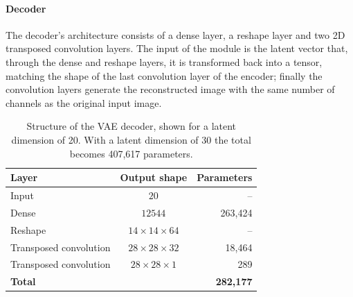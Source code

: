 \paragraph{Decoder}
\hfill \break
The decoder's architecture consists of a dense layer, a reshape layer and two 2D transposed convolution layers. The input of the module is the latent vector that, through the dense and reshape layers, it is transformed back into a tensor, matching the shape of the last convolution layer of the encoder; finally the convolution layers generate the reconstructed image with the same number of channels as the original input image.
\begin{table}[H]
    \centering
    \begin{tabular}{l c r}
    \textbf{Layer} & \textbf{Output shape} & \textbf{Parameters} \\
    \hline
    Input & \( 20 \) & -- \\
    Dense & \( 12544 \) & 263{,}424 \\
    Reshape & \( 14 \times 14 \times 64 \) & -- \\
    Transposed convolution & \( 28 \times 28 \times 32 \) & 18{,}464 \\
    Transposed convolution & \( 28 \times 28 \times 1 \) & 289 \\
    \hline
    \textbf{Total} & & \textbf{282{,}177} \\
    \end{tabular}
    \caption{Structure of the VAE decoder, shown for a latent dimension of 20. With a latent dimension of 30 the total becomes 407{,}617 parameters.}
    \label{tab:vae decoder}
\end{table}
